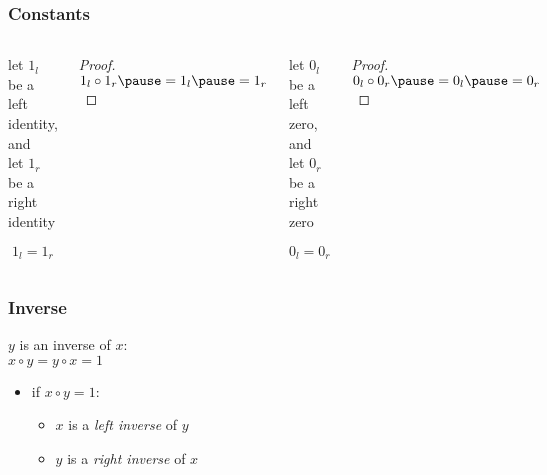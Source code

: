 \documentclass[dvipsnames]{beamer}
\begin{document}
\begin{frame}
  \frametitle{Constants}

  \begin{columns}
    \begin{theorem}
      let $1_l$ be a left identity, and\\
      let $1_r$ be a right identity

      \[ 1_l = 1_r \]
    \end{theorem}

    \pause
    \begin{proof}
      $1_l \circ 1_r \pause = 1_l \pause = 1_r$
    \end{proof}

    \pause
    \begin{theorem}
      let $0_l$ be a left zero, and\\
      let $0_r$ be a right zero

      \[ 0_l = 0_r \]
    \end{theorem}

    \pause
    \begin{proof}
      $0_l \circ 0_r \pause = 0_l \pause = 0_r$
    \end{proof}
  \end{columns}
\end{frame}

\begin{frame}
  \frametitle{Inverse}

  \begin{definition}
    $y$ is an \alert{inverse} of $x$:\\
    $x \circ y = y \circ x = 1$
  \end{definition}

  \pause
  \begin{itemize}
    \item if $x \circ y = 1$:
    \begin{itemize}
      \item $x$ is a \emph{left inverse} of $y$
      \item $y$ is a \emph{right inverse} of $x$
    \end{itemize}
  \end{itemize}
\end{frame}
\end{document}
